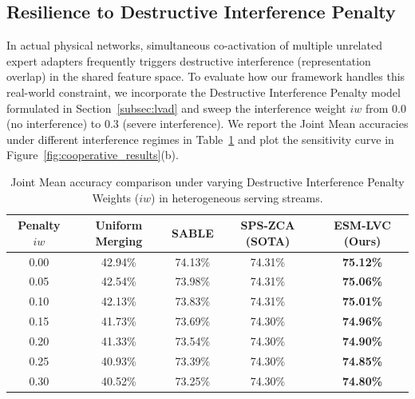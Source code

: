 \subsection{Resilience to Destructive Interference Penalty}
\label{subsec:interference_results}
In actual physical networks, simultaneous co-activation of multiple unrelated expert adapters frequently triggers destructive interference (representation overlap) in the shared feature space. To evaluate how our framework handles this real-world constraint, we incorporate the Destructive Interference Penalty model formulated in Section~\ref{subsec:lvad} and sweep the interference weight $iw$ from $0.0$ (no interference) to $0.3$ (severe interference). We report the Joint Mean accuracies under different interference regimes in Table~\ref{tab:interference_results} and plot the sensitivity curve in Figure~\ref{fig:cooperative_results}(b).

\begin{table}[t]
\caption{Joint Mean accuracy comparison under varying Destructive Interference Penalty Weights ($iw$) in heterogeneous serving streams.}
\label{tab:interference_results}
\vskip 0.15in
\begin{center}
\begin{small}
\begin{sc}
\begin{tabular}{ccccc}
\toprule
Penalty $iw$ & Uniform Merging & SABLE & SPS-ZCA (SOTA) & \textbf{ESM-LVC (Ours)} \\
\midrule
0.00 & 42.94\% & 74.13\% & 74.31\% & \textbf{75.12\%} \\
0.05 & 42.54\% & 73.98\% & 74.31\% & \textbf{75.06\%} \\
0.10 & 42.13\% & 73.83\% & 74.31\% & \textbf{75.01\%} \\
0.15 & 41.73\% & 73.69\% & 74.30\% & \textbf{74.96\%} \\
0.20 & 41.33\% & 73.54\% & 74.30\% & \textbf{74.90\%} \\
0.25 & 40.93\% & 73.39\% & 74.30\% & \textbf{74.85\%} \\
0.30 & 40.52\% & 73.25\% & 74.30\% & \textbf{74.80\%} \\
\bottomrule
\end{tabular}
\end{sc}
\end{small}
\end{center}
\vskip -0.1in
\end{table}

